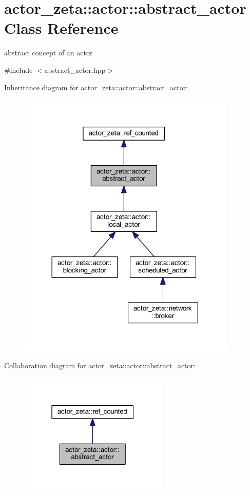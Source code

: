 \hypertarget{classactor__zeta_1_1actor_1_1abstract__actor}{}\section{actor\+\_\+zeta\+:\+:actor\+:\+:abstract\+\_\+actor Class Reference}
\label{classactor__zeta_1_1actor_1_1abstract__actor}


abstract concept of an actor  




{\ttfamily \#include $<$abstract\+\_\+actor.\+hpp$>$}



Inheritance diagram for actor\+\_\+zeta\+:\+:actor\+:\+:abstract\+\_\+actor\+:\nopagebreak
\begin{figure}[H]
\begin{center}
\leavevmode
\includegraphics[width=293pt]{classactor__zeta_1_1actor_1_1abstract__actor__inherit__graph}
\end{center}
\end{figure}


Collaboration diagram for actor\+\_\+zeta\+:\+:actor\+:\+:abstract\+\_\+actor\+:\nopagebreak
\begin{figure}[H]
\begin{center}
\leavevmode
\includegraphics[width=199pt]{classactor__zeta_1_1actor_1_1abstract__actor__coll__graph}
\end{center}
\end{figure}
